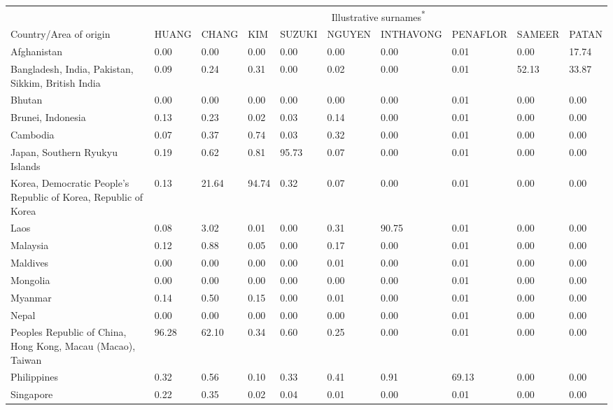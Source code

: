 \documentclass[
  landscape]{article}
\begin{document}
\begin{table}[!h]
\centering
\begin{threeparttable}
\begin{tabular}[t]{>{\raggedright\arraybackslash}p{5cm}lllllllll}
\toprule
\multicolumn{1}{c}{ } & \multicolumn{9}{c}{Illustrative surnames\textsuperscript{*}} \\
\cmidrule(l{3pt}r{3pt}){2-10}
Country/Area of origin & HUANG        & CHANG        & KIM          & SUZUKI       & NGUYEN       & INTHAVONG    & PENAFLOR     & SAMEER       & PATAN       \\
\midrule
Afghanistan & 0.00 & 0.00 & 0.00 & 0.00 & 0.00 & 0.00 & 0.01 & 0.00 & 17.74\\
Bangladesh, India, Pakistan, Sikkim, British India & 0.09 & 0.24 & 0.31 & 0.00 & 0.02 & 0.00 & 0.01 & 52.13 & 33.87\\
Bhutan & 0.00 & 0.00 & 0.00 & 0.00 & 0.00 & 0.00 & 0.01 & 0.00 & 0.00\\
Brunei, Indonesia & 0.13 & 0.23 & 0.02 & 0.03 & 0.14 & 0.00 & 0.01 & 0.00 & 0.00\\
Cambodia & 0.07 & 0.37 & 0.74 & 0.03 & 0.32 & 0.00 & 0.01 & 0.00 & 0.00\\
\addlinespace
Japan, Southern Ryukyu Islands & 0.19 & 0.62 & 0.81 & 95.73 & 0.07 & 0.00 & 0.01 & 0.00 & 0.00\\
Korea, Democratic People’s Republic of Korea, Republic of Korea & 0.13 & 21.64 & 94.74 & 0.32 & 0.07 & 0.00 & 0.01 & 0.00 & 0.00\\
Laos & 0.08 & 3.02 & 0.01 & 0.00 & 0.31 & 90.75 & 0.01 & 0.00 & 0.00\\
Malaysia & 0.12 & 0.88 & 0.05 & 0.00 & 0.17 & 0.00 & 0.01 & 0.00 & 0.00\\
Maldives & 0.00 & 0.00 & 0.00 & 0.00 & 0.01 & 0.00 & 0.01 & 0.00 & 0.00\\
\addlinespace
Mongolia & 0.00 & 0.00 & 0.00 & 0.00 & 0.00 & 0.00 & 0.01 & 0.00 & 0.00\\
Myanmar & 0.14 & 0.50 & 0.15 & 0.00 & 0.01 & 0.00 & 0.01 & 0.00 & 0.00\\
Nepal & 0.00 & 0.00 & 0.00 & 0.00 & 0.00 & 0.00 & 0.01 & 0.00 & 0.00\\
Peoples Republic of China, Hong Kong, Macau (Macao), Taiwan & 96.28 & 62.10 & 0.34 & 0.60 & 0.25 & 0.00 & 0.01 & 0.00 & 0.00\\
Philippines & 0.32 & 0.56 & 0.10 & 0.33 & 0.41 & 0.91 & 69.13 & 0.00 & 0.00\\
\addlinespace
Singapore & 0.22 & 0.35 & 0.02 & 0.04 & 0.01 & 0.00 & 0.01 & 0.00 & 0.00\\

\end{tabular}
\end{threeparttable}
\end{table}
\end{document}
